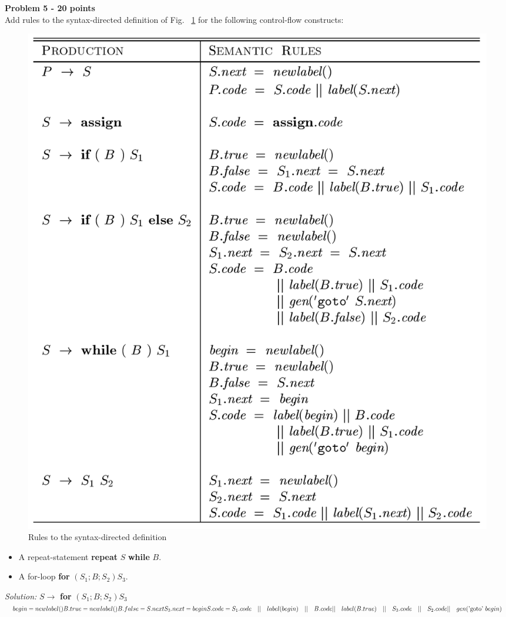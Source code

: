 \documentclass[a4paper, 11pt]{article}
\newenvironment{problem}[2][Problem]
    { \begin{mdframed}[backgroundcolor=gray!20] \textbf{#1 #2} \\}
    {  \end{mdframed}}
\newenvironment{solution}
    {\textit{Solution:}}
    {}
\begin{document}
\begin{problem}{5 - 20 points}
Add rules to the syntax-directed definition of Fig. ~\ref{fig_5}  for  the following control-flow constructs:  
\begin{figure}[H]
    \centering
    \includegraphics[scale=0.75]{sdd.png}
    \caption{Rules to the syntax-directed definition}
    \label{fig_5}
\end{figure}

\begin{itemize}
    \item A repeat-statement {\bf repeat} $S$ {\bf while} $B$.
    \item A for-loop {\bf for} $(S_1; B ; S_2 ) S_3$. 
\end{itemize}

\end{problem}

\begin{solution}
    $S \rightarrow$ {\bf for} $(S_1; B; S_2) S_3$ \\
    $begin = newlabel() \\
    B.true = newlabel() \\
    B.false = S.next \\
    S_3.next = begin \\
    S.code = S_1.code \quad || \quad label(begin) \quad || \quad B.code \\
    || \quad label(B.true) \quad || \quad S_3.code \quad || \quad S_2.code \\
    || \quad gen(\text{'goto' } begin)$
\end{solution} 
\end{document}

